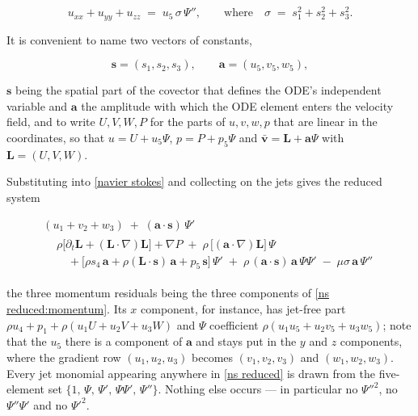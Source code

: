\documentclass{article}
\theoremstyle{definition}
\theoremstyle{plain}
\begin{document}
\begin{nsexample}
\begin{equation}
\label{ns laplacian}
u_{xx}+u_{yy}+u_{zz} \;=\; u_5\,\sigma\,\Psi'' ,
\qquad \text{where} \quad \sigma \;=\; s_1^2+s_2^2+s_3^2 .
\end{equation}

It is convenient to name two vectors of constants,

\begin{equation*}
\mathbf{s} = (s_1,s_2,s_3), \qquad \mathbf{a} = (u_5,v_5,w_5),
\end{equation*}

\noindent
$\mathbf{s}$ being the spatial part of the covector that defines the ODE's
independent variable and $\mathbf{a}$ the amplitude with which the ODE element
enters the velocity field, and to write $U,V,W,P$ for the parts of $u,v,w,p$
that are linear in the coordinates, so that $u = U + u_5 \Psi$,
$p = P + p_5\Psi$ and $\mathbf{\bar{v}} = \mathbf{L} + \mathbf{a}\Psi$ with
$\mathbf{L} = (U,V,W)$.

Substituting into \eqref{navier stokes} and collecting on the jets gives the
reduced system

\begin{subequations}
\label{ns reduced}
\begin{gather}
(u_1+v_2+w_3) \;+\; (\mathbf{a}\cdot\mathbf{s})\,\Psi' \label{ns reduced:continuity} \\
\begin{aligned}
&\rho\bigl[\partial_t \mathbf{L} + (\mathbf{L}\cdot\nabla)\mathbf{L}\bigr] + \nabla P
   \;+\; \rho\,\bigl[(\mathbf{a}\cdot\nabla)\mathbf{L}\bigr]\,\Psi \\
&\quad {} + \bigl[\rho s_4\,\mathbf{a} + \rho(\mathbf{L}\cdot\mathbf{s})\,\mathbf{a}
   + p_5\,\mathbf{s}\bigr]\,\Psi'
   \;+\; \rho\,(\mathbf{a}\cdot\mathbf{s})\,\mathbf{a}\,\Psi\Psi'
   \;-\; \mu\sigma\,\mathbf{a}\,\Psi''
\end{aligned} \label{ns reduced:momentum}
\end{gather}
\end{subequations}

\noindent
the three momentum residuals being the three components of
\eqref{ns reduced:momentum}.  Its $x$ component, for instance, has jet-free
part $\rho u_4 + p_1 + \rho(u_1 U + u_2 V + u_3 W)$ and $\Psi$ coefficient
$\rho(u_1 u_5 + u_2 v_5 + u_3 w_5)$; note that the $u_5$ there is a component
of $\mathbf{a}$ and stays put in the $y$ and $z$ components, where the
gradient row $(u_1,u_2,u_3)$ becomes $(v_1,v_2,v_3)$ and $(w_1,w_2,w_3)$.
Every jet monomial appearing anywhere in \eqref{ns reduced} is drawn from the
five-element set $\{1,\,\Psi,\,\Psi',\,\Psi\Psi',\,\Psi''\}$.  Nothing else
occurs --- in particular no $\Psi''^2$, no $\Psi''\Psi'$ and no $\Psi'^2$.


\end{nsexample}
\end{document}
